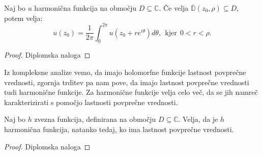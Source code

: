 \documentclass[mat1]{fmfdelo}
\newcommand{\C}{\mathbb C}
\begin{document}
    \begin{trditev}
        Naj bo $u$ harmonična funkcija na območju $D \subseteq \C$. Če velja $\overline{\mathbb{D}}(z_0, \rho) \subseteq D$, potem velja:
            $$
                u(z_0) = \frac{1}{2 \pi} \int_{0}^{2 \pi}{u(z_0 + r e^{i \theta}) d\theta},~~\text{kjer}~~ 0 < r < \rho.
            $$
    \end{trditev}
    \begin{proof}
        Diplomska naloga
    \end{proof}
    \begin{opomba}
        Iz kompleksne analize vemo, da imajo holomorfne funkcije lastnost povprečne vrednosti, zgornja trditev pa nam pove, da imajo lastnost povprečne vrednosti tudi harmonične funkcije. 
        Za harmonične funkcije velja celo več, da se jih namreč karakterizirati s pomočjo lastnosti povprečne vrednosti. 
    \end{opomba}
    \begin{trditev}
        Naj bo $h$ zvezna funkcija, definirana na območju $D \subseteq \C$. Velja, da je $h$ harmonična funkcija, natanko tedaj, ko ima lastnost povprečne vrednosti.
    \end{trditev}
    \begin{proof}
        Diplomska naloga
    \end{proof}

\newpage
\end{document}

